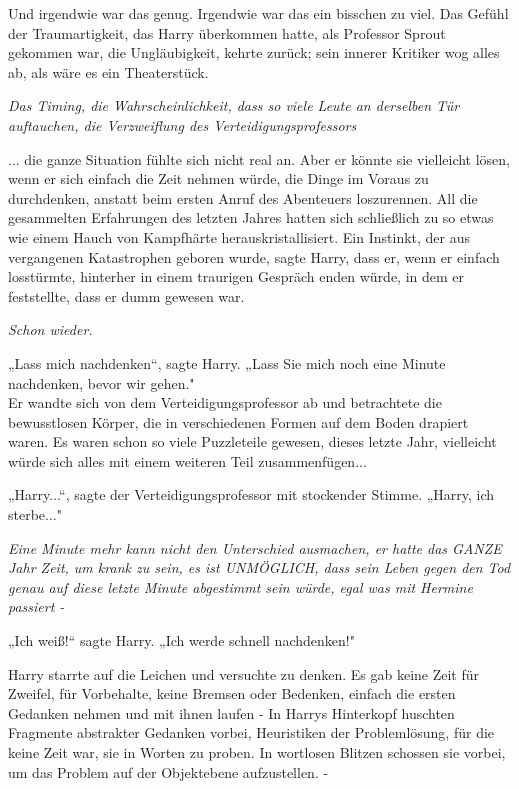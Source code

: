 {Und irgendwie war das genug. Irgendwie war das ein bisschen zu viel. Das Gefühl der Traumartigkeit, das Harry überkommen hatte, als Professor Sprout gekommen war, die Ungläubigkeit, kehrte zurück; sein innerer Kritiker wog alles ab, als wäre es ein Theaterstück.

\emph{Das Timing, die Wahrscheinlichkeit, dass so viele Leute an derselben Tür auftauchen, die Verzweiflung des Verteidigungsprofessors}

... die ganze Situation fühlte sich nicht real an. Aber er könnte sie vielleicht lösen, wenn er sich einfach die Zeit nehmen würde, die Dinge im Voraus zu durchdenken, anstatt beim ersten Anruf des Abenteuers loszurennen. All die gesammelten Erfahrungen des letzten Jahres hatten sich schließlich zu so etwas wie einem Hauch von Kampfhärte herauskristallisiert. Ein Instinkt, der aus vergangenen Katastrophen geboren wurde, sagte Harry, dass er, wenn er einfach losstürmte, hinterher in einem traurigen Gespräch enden würde, in dem er feststellte, dass er dumm gewesen war.

\emph{Schon wieder.}

„Lass mich nachdenken“, sagte Harry. „Lass Sie mich noch eine Minute nachdenken, bevor wir gehen."\\ Er wandte sich von dem Verteidigungsprofessor ab und betrachtete die bewusstlosen Körper, die in verschiedenen Formen auf dem Boden drapiert waren. Es waren schon so viele Puzzleteile gewesen, dieses letzte Jahr, vielleicht würde sich alles mit einem weiteren Teil zusammenfügen...

„Harry...“, sagte der Verteidigungsprofessor mit stockender Stimme. „Harry, ich sterbe..."

\emph{Eine Minute mehr kann nicht den Unterschied ausmachen, er hatte das GANZE Jahr Zeit, um krank zu sein, es ist UNMÖGLICH, dass sein Leben gegen den Tod genau auf diese letzte Minute abgestimmt sein würde, egal was mit Hermine passiert -}

„Ich weiß!“ sagte Harry. „Ich werde schnell nachdenken!"

Harry starrte auf die Leichen und versuchte zu denken. Es gab keine Zeit für Zweifel, für Vorbehalte, keine Bremsen oder Bedenken, einfach die ersten Gedanken nehmen und mit ihnen laufen - In Harrys Hinterkopf huschten Fragmente abstrakter Gedanken vorbei, Heuristiken der Problemlösung, für die keine Zeit war, sie in Worten zu proben. In wortlosen Blitzen schossen sie vorbei, um das Problem auf der Objektebene aufzustellen. -

}
